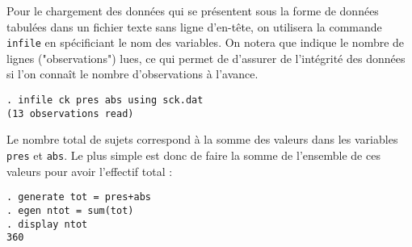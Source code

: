 %
%
%
\soln{\ref{exo:10.5}}
Pour le chargement des données qui se présentent sous la forme de données
tabulées dans un fichier texte sans ligne d'en-tête, on utilisera la
commande \texttt{infile} en spécificiant le nom des variables. On notera que
\Stata indique le nombre de lignes ("observations") lues, ce qui permet de
d'assurer de l'intégrité des données si l'on connaît le nombre
d'observations à l'avance.
\begin{verbatim}
. infile ck pres abs using sck.dat
(13 observations read)
\end{verbatim}

Le nombre total de sujets correspond à la somme des valeurs dans les
variables \texttt{pres} et \texttt{abs}. Le plus simple est donc de faire la
somme de l'ensemble de ces valeurs pour avoir l'effectif total :
\begin{verbatim}
. generate tot = pres+abs
. egen ntot = sum(tot)
. display ntot
360
\end{verbatim}


